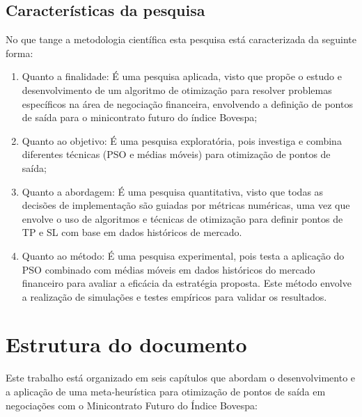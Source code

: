 \documentclass{iftex2024}
\begin{document}
\subsection{Características da pesquisa}

No que tange a metodologia científica esta pesquisa está caracterizada da
seguinte forma:

\begin{enumerate}
  \item Quanto a finalidade: É uma pesquisa aplicada, visto que propõe o estudo e
  desenvolvimento de um algoritmo de otimização para resolver problemas específicos na área
  de negociação financeira, envolvendo a definição de pontos de saída para o minicontrato
  futuro do índice Bovespa;
  \item Quanto ao objetivo: É uma pesquisa exploratória, pois investiga e combina
  diferentes técnicas (PSO e médias móveis) para otimização de pontos de saída;
  \item Quanto a abordagem: É uma pesquisa quantitativa, visto que todas as
  decisões de implementação são guiadas por métricas numéricas, uma vez que envolve o
  uso de algoritmos e técnicas de otimização para definir pontos de TP e SL
  com base em dados históricos de mercado.
  \item Quanto ao método: É uma pesquisa experimental, pois testa a aplicação
  do PSO combinado com médias móveis em dados históricos do mercado financeiro para
  avaliar a eficácia da estratégia proposta. Este método envolve a realização de simulações e
  testes empíricos para validar os resultados.
 \end{enumerate}

\section{Estrutura do documento}

Este trabalho está organizado em seis capítulos que abordam o desenvolvimento e a aplicação de uma meta-heurística 
para otimização de pontos de saída em negociações com o Minicontrato Futuro do Índice Bovespa:
\end{document}
